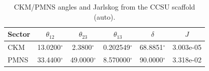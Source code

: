\begin{table}[h]
\centering
\begin{tabular}{lccccc}
\toprule
Sector & $\theta_{12}$ & $\theta_{23}$ & $\theta_{13}$ & $\delta$ & $J$ \\
\midrule
CKM & 13.0200$^\circ$ & 2.3800$^\circ$ & 0.202549$^\circ$ & 68.8851$^\circ$ & 3.003e-05 \\
PMNS & 33.4400$^\circ$ & 49.0000$^\circ$ & 8.570000$^\circ$ & 90.0000$^\circ$ & 3.318e-02 \\
\bottomrule
\end{tabular}
\caption{CKM/PMNS angles and Jarlskog from the CCSU scaffold (auto).}
\label{tab:ckm-pmns-auto}
\end{table}
